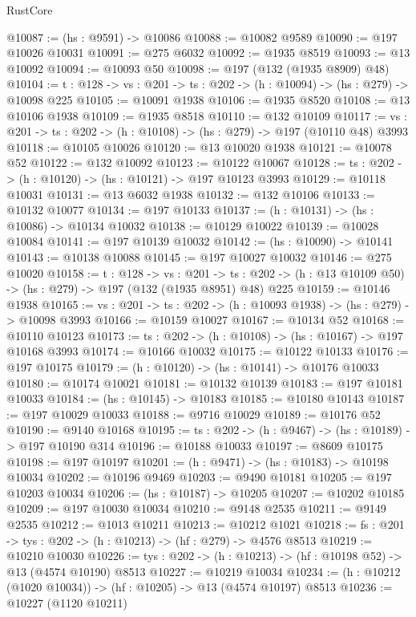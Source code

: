 \begin{lexlean}{RustCore}
\begin{coremodule}
@10087 := (hs : @9591) -> @10086
@10088 := @10082 @9589
@10090 := @197 @10026 @10031
@10091 := @275 @6032
@10092 := @1935 @8519
@10093 := @13 @10092
@10094 := @10093 @50
@10098 := @197 (@132 (@1935 @8909) @48)
@10104 := {t : @128} -> {vs : @201} -> {ts : @202} -> (h : @10094) -> (hs : @279) -> @10098 @225
@10105 := @10091 @1938
@10106 := @1935 @8520
@10108 := @13 @10106 @1938
@10109 := @1935 @8518
@10110 := @132 @10109
@10117 := {vs : @201} -> {ts : @202} -> (h : @10108) -> (hs : @279) -> @197 (@10110 @48) @3993
@10118 := @10105 @10026
@10120 := @13 @10020 @1938
@10121 := @10078 @52
@10122 := @132 @10092
@10123 := @10122 @10067
@10128 := {ts : @202} -> (h : @10120) -> (hs : @10121) -> @197 @10123 @3993
@10129 := @10118 @10031
@10131 := @13 @6032 @1938
@10132 := @132 @10106
@10133 := @10132 @10077
@10134 := @197 @10133
@10137 := (h : @10131) -> (hs : @10086) -> @10134 @10032
@10138 := @10129 @10022
@10139 := @10028 @10084
@10141 := @197 @10139 @10032
@10142 := (hs : @10090) -> @10141
@10143 := @10138 @10088
@10145 := @197 @10027 @10032
@10146 := @275 @10020
@10158 := {t : @128} ->
  {vs : @201} ->
  {ts : @202} -> (h : @13 @10109 @50) -> (hs : @279) -> @197 (@132 (@1935 @8951) @48) @225
@10159 := @10146 @1938
@10165 := {vs : @201} -> {ts : @202} -> (h : @10093 @1938) -> (hs : @279) -> @10098 @3993
@10166 := @10159 @10027
@10167 := @10134 @52
@10168 := @10110 @10123
@10173 := {ts : @202} -> (h : @10108) -> (hs : @10167) -> @197 @10168 @3993
@10174 := @10166 @10032
@10175 := @10122 @10133
@10176 := @197 @10175
@10179 := (h : @10120) -> (hs : @10141) -> @10176 @10033
@10180 := @10174 @10021
@10181 := @10132 @10139
@10183 := @197 @10181 @10033
@10184 := (hs : @10145) -> @10183
@10185 := @10180 @10143
@10187 := @197 @10029 @10033
@10188 := @9716 @10029
@10189 := @10176 @52
@10190 := @9140 @10168
@10195 := {ts : @202} -> (h : @9467) -> (hs : @10189) -> @197 @10190 @314
@10196 := @10188 @10033
@10197 := @8609 @10175
@10198 := @197 @10197
@10201 := (h : @9471) -> (hs : @10183) -> @10198 @10034
@10202 := @10196 @9469
@10203 := @9490 @10181
@10205 := @197 @10203 @10034
@10206 := (hs : @10187) -> @10205
@10207 := @10202 @10185
@10209 := @197 @10030 @10034
@10210 := @9148 @2535
@10211 := @9149 @2535
@10212 := @1013 @10211
@10213 := @10212 @1021
@10218 := {fs : @201} -> {tys : @202} -> (h : @10213) -> (hf : @279) -> @4576 @8513
@10219 := @10210 @10030
@10226 := {tys : @202} -> (h : @10213) -> (hf : @10198 @52) -> @13 (@4574 @10190) @8513
@10227 := @10219 @10034
@10234 := (h : @10212 (@1020 @10034)) -> (hf : @10205) -> @13 (@4574 @10197) @8513
@10236 := @10227 (@1120 @10211)

\end{coremodule}
\end{lexlean}
